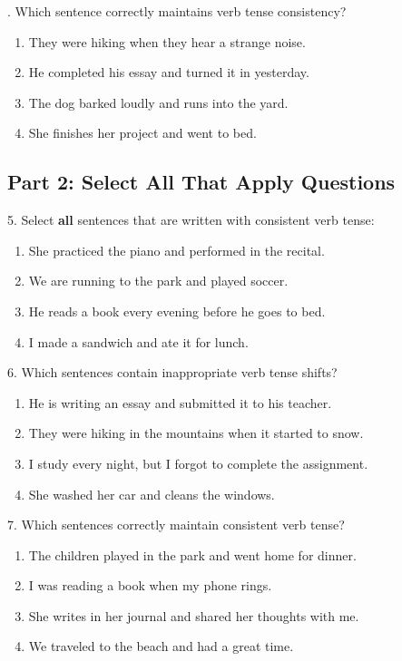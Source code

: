 \documentclass[12pt]{article}
\begin{document}
\vspace{1cm}
. Which sentence correctly maintains verb tense consistency?  
\begin{enumerate}[label=\Alph*.]
    \item They were hiking when they hear a strange noise.  
    \item He completed his essay and turned it in yesterday.  
    \item The dog barked loudly and runs into the yard.  
    \item She finishes her project and went to bed.  
\end{enumerate}



\subsection*{Part 2: Select All That Apply Questions}

5. Select \textbf{all} sentences that are written with consistent verb tense:  
\begin{enumerate}[label=\Alph*.]
    \item She practiced the piano and performed in the recital.  
    \item We are running to the park and played soccer.  
    \item He reads a book every evening before he goes to bed.  
    \item I made a sandwich and ate it for lunch.  
\end{enumerate}

\vspace{1cm}

6. Which sentences contain inappropriate verb tense shifts?  
\begin{enumerate}[label=\Alph*.]
    \item He is writing an essay and submitted it to his teacher.  
    \item They were hiking in the mountains when it started to snow.  
    \item I study every night, but I forgot to complete the assignment.  
    \item She washed her car and cleans the windows.  
\end{enumerate}

\vspace{1cm}

7. Which sentences correctly maintain consistent verb tense?  
\begin{enumerate}[label=\Alph*.]
    \item The children played in the park and went home for dinner.  
    \item I was reading a book when my phone rings.  
    \item She writes in her journal and shared her thoughts with me.  
    \item We traveled to the beach and had a great time.  
\end{enumerate}
\end{document}
